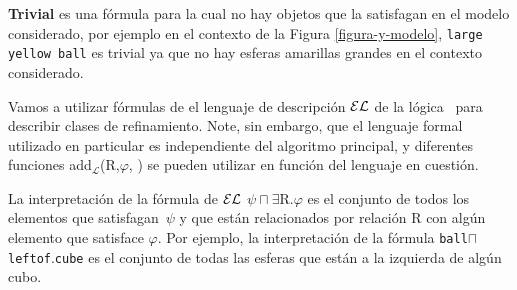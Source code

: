 \textbf{Trivial} es una f\'ormula para la cual no hay objetos que la satisfagan en el modelo considerado, por ejemplo en el contexto de la 
Figura \ref{figura-y-modelo}, \texttt{large yellow ball} es trivial ya que no hay esferas amarillas grandes en el contexto considerado.

Vamos a utilizar f\'ormulas de el lenguaje de descripci\'on $\mathcal{EL}$ de la l\'ogica~\cite{baad:desc03} para describir clases de refinamiento.
Note, sin embargo, que el lenguaje formal utilizado en particular es independiente del algoritmo principal, y diferentes 
funciones add$_{\mathcal {L}}$(R,$\varphi $, \RE) se pueden utilizar en funci\'on del lenguaje en cuesti\'on.

La interpretaci\'on de la f\'ormula de $\mathcal{EL}$  $\psi \sqcap \exists $R.$ \varphi$ es el conjunto de todos los elementos que 
satisfagan~$\psi$ y que est\'an relacionados por relaci\'on R con alg\'un elemento que satisface $\varphi $.
Por ejemplo, la interpretaci\'on de la f\'ormula \texttt{ball}$\sqcap$ \texttt{leftof}.\texttt{cube} es el conjunto de todas las esferas 
que est\'an a la izquierda de alg\'un cubo.

